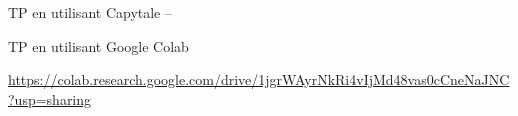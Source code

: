\documentclass[10pt,fleqn]{article} %
\newcommand{\repRel}{../../../..}
\newcommand{\repExo}{dossier}
\newcommand{\repStyle}{\repRel/Style}
\begin{document}
\def\xxcompetences{}
\def\xxfigures{}





\livrettrue
\graphicspath{{\repStyle/png/}}

\graphicspath{{\repStyle/png/}{\repRel/Informatique/Semestre_01/01_Bases/Cours/images/}}
%



\newpage
\proffalse
\renewcommand{\repExo}{QCM_01}

\graphicspath{{\repStyle/png/}{\repRel/Informatique/Semestre_01/01_Bases/Application_01/images/}}
%

\begin{center}
TP en utilisant Capytale -- 
\end{center}

\begin{center}
TP en utilisant Google Colab

\url{https://colab.research.google.com/drive/1jgrWAyrNkRi4vIjMd48vas0cCneNaJNC?usp=sharing}
\end{center}
\end{document}
